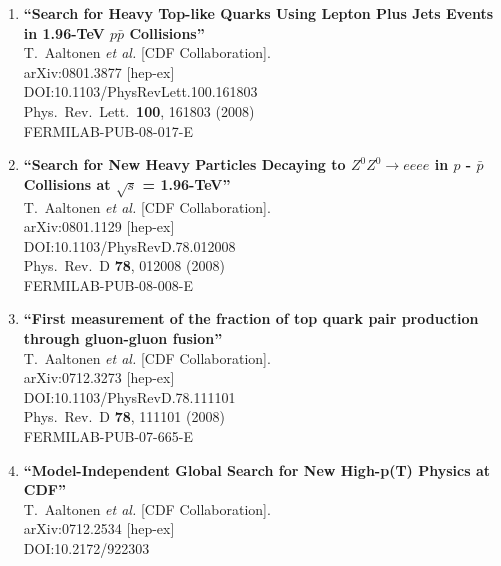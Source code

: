 \documentclass{article}
\begin{document}
\begin{enumerate}
\item%
{\bf ``Search for Heavy Top-like Quarks Using Lepton Plus Jets Events in 1.96-TeV $p \bar{p}$ Collisions''}
  \\{}T.~Aaltonen {\it et al.} [CDF Collaboration].
  \\{}arXiv:0801.3877 [hep-ex]
  \\{}DOI:10.1103/PhysRevLett.100.161803
  \\{}Phys.\ Rev.\ Lett.\  {\bf 100}, 161803 (2008)
  \\{}FERMILAB-PUB-08-017-E
\item%
{\bf ``Search for New Heavy Particles Decaying to $Z^0 Z^0 \to eeee$ in $p$ - $\bar{p}$ Collisions at $\sqrt{s}$ = 1.96-TeV''}
  \\{}T.~Aaltonen {\it et al.} [CDF Collaboration].
  \\{}arXiv:0801.1129 [hep-ex]
  \\{}DOI:10.1103/PhysRevD.78.012008
  \\{}Phys.\ Rev.\ D {\bf 78}, 012008 (2008)
  \\{}FERMILAB-PUB-08-008-E
\item%
{\bf ``First measurement of the fraction of top quark pair production through gluon-gluon fusion''}
  \\{}T.~Aaltonen {\it et al.} [CDF Collaboration].
  \\{}arXiv:0712.3273 [hep-ex]
  \\{}DOI:10.1103/PhysRevD.78.111101
  \\{}Phys.\ Rev.\ D {\bf 78}, 111101 (2008)
  \\{}FERMILAB-PUB-07-665-E
\item%
{\bf ``Model-Independent Global Search for New High-p(T) Physics at CDF''}
  \\{}T.~Aaltonen {\it et al.} [CDF Collaboration].
  \\{}arXiv:0712.2534 [hep-ex]
  \\{}DOI:10.2172/922303

\end{enumerate}
\end{document}
